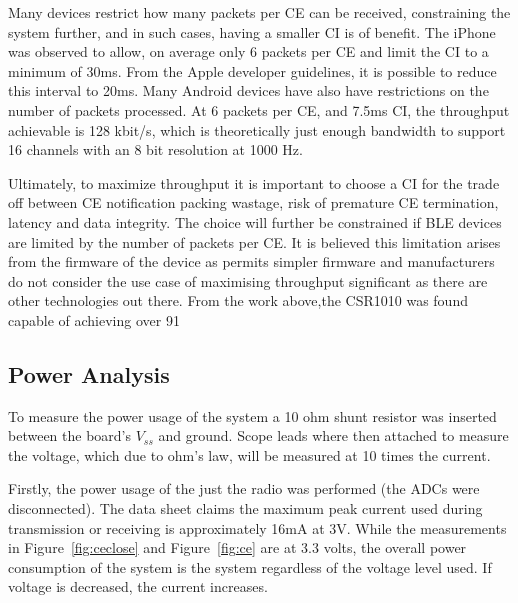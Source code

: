 \documentclass[]{article}
\begin{document}
 Many devices restrict how many packets per \ac{CE} can be received, constraining the system further, and in such cases, having a smaller \ac{CI} is of benefit. The iPhone was observed to allow, on average only 6 packets per \ac{CE} and limit the \ac{CI} to a minimum of 30ms. From the Apple developer guidelines, it is possible to reduce this interval to 20ms. Many Android devices have also have restrictions on the number of packets processed. At 6 packets per \ac{CE}, and 7.5ms \ac{CI}, the throughput achievable is 128 kbit/s, which is theoretically just enough bandwidth to support 16 channels with an 8 bit resolution at 1000 Hz.

Ultimately, to maximize throughput it is important to choose a \ac{CI} for the trade off between \ac{CE} notification packing wastage, risk of premature \ac{CE} termination, latency and data integrity. The choice will further be constrained if \ac{BLE} devices are limited by the number of packets per \ac{CE}. It is believed this limitation arises from the firmware of the device as permits simpler firmware and manufacturers do not consider the use case of maximising throughput significant as there are other technologies out there. From the work above,the CSR1010 was found capable of achieving over 91%















\subsection{Power Analysis}

To measure the power usage of the system a 10 ohm shunt resistor was inserted between the board's $V_{ss}$ and ground. Scope leads where then attached to measure the voltage, which due to ohm's law, will be measured at 10 times the current. 

Firstly, the power usage of the just the radio was performed (the ADCs were disconnected).  The data sheet claims the maximum peak current used during transmission or receiving is approximately 16mA at 3V. While the measurements in Figure~\ref{fig:ceclose} and Figure~\ref{fig:ce} are at 3.3 volts, the overall power consumption of the system is the system regardless of the voltage level used. If voltage is decreased, the current increases.
\end{document}
